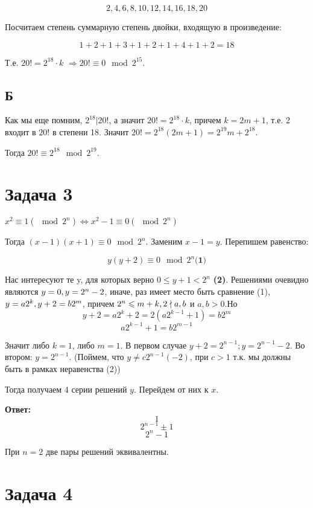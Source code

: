 \documentclass{article}
\begin{document}
	$$2, 4, 6, 8, 10, 12, 14, 16, 18, 20$$
	
	Посчитаем степень суммарную степень двойки, входящую в произведение:
	
	$$1 + 2 + 1 + 3 + 1 + 2 + 1 + 4 + 1 + 2 = 18$$
	
	Т.е. $20! = 2^{18} \cdot k$  $\Rightarrow 20! \equiv 0 \mod 2^{15}$.
	
	\subsection{Б}
	
	Как мы еще помним, $2^{18} | 20!$, а значит $20! = 2^{18} \cdot k$, причем $k = 2m + 1$, т.е. 2 входит в $20!$ в степени 18. Значит $20! = 2^{18} (2m + 1) = 2^{19}m + 2^{18}$.
	
	Тогда $20! \equiv 2^{18} \mod 2^{19}$.
	
	\section{Задача 3}
	
	$x^2 \equiv 1 (\mod 2^n) \Leftrightarrow x^2 - 1 \equiv 0 (\mod 2^n)$
	
	Тогда $(x - 1)(x + 1) \equiv 0 \mod 2^n$. Заменим $x - 1 = y$. Перепишем равенство:
	
	$$ y(y + 2) \equiv 0 \mod 2^n  \textbf{(1)}$$
	
	Нас интересуют те y, для которых верно $0 \leqslant y + 1 < 2^n $ \textbf{(2)}.
	Решениями очевидно являются $y = 0,\space y = 2^n - 2$, иначе, раз имеет место быть сравнение (1), $y = a2^k,\space y + 2 = b2^m$, причем $2^n \leqslant m + k,\space 2\nmid a,b$ и $a,b > 0$.Но 
	$$y + 2 = a2^k + 2 = 2(a2^{k-1} + 1) = b2^m$$
	$$a2^{k - 1} + 1 = b2^{m - 1}$$ 
	
	Значит либо $k = 1$, либо $m = 1$. В первом случае $y + 2 = 2^{n - 1}; y = 2^{n - 1} - 2$. Во втором: $y=2^{n - 1}$. (Поймем, что  $y \ne c2^{n - 1} (- 2)$, при $c > 1$ т.к. мы должны быть в рамках неравенства (2))
	
	Тогда получаем 4 серии решений $y$. Перейдем от них к $x$.
	
	\textbf{Ответ:} $$1$$
	$$2^{n - 1} \pm 1$$
	$$2^n - 1$$
	
	При $n=2$ две пары решений эквивалентны.
	
	\section{Задача 4}
	
\end{document}

